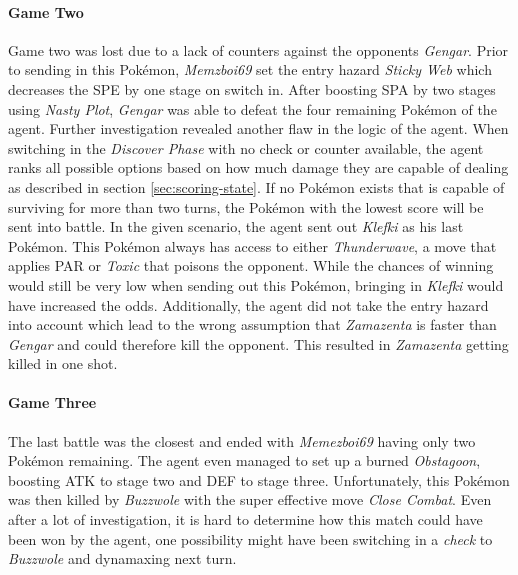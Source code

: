 \paragraph{Game Two}
Game two was lost due to a lack of counters against the opponents \textit{Gengar}. Prior to sending in this Pokémon,
\textit{Memzboi69} set the entry hazard \textit{Sticky Web} which decreases the \ac{SPE} by one stage on switch in.
After boosting \ac{SPA} by two stages using \textit{Nasty Plot}, \textit{Gengar} was able to defeat the four 
remaining Pokémon of the agent. Further investigation revealed another flaw in the logic of the agent. When switching
in the \textit{Discover Phase} with no check or counter available, the agent ranks all possible options based on how 
much damage they are capable of dealing as described in section \ref{sec:scoring-state}.
If no Pokémon exists that is capable of surviving for more than two turns, the Pokémon with the lowest score will
be sent into battle. In the given scenario, the agent sent out \textit{Klefki} as his last Pokémon. This Pokémon
always has access to either \textit{Thunderwave}, a move that applies \ac{PAR} or \textit{Toxic} that poisons the
opponent. While the chances of winning would still be very low when sending out this Pokémon, bringing in \textit{Klefki}
would have increased the odds. Additionally, the agent did not take the entry hazard into account which lead to
the wrong assumption that \textit{Zamazenta} is faster than \textit{Gengar} and could therefore kill the opponent.
This resulted in \textit{Zamazenta} getting killed in one shot.

\paragraph{Game Three}
The last battle was the closest and ended with \textit{Memezboi69} having only two Pokémon remaining. The agent
even managed to set up a burned \textit{Obstagoon}, boosting \ac{ATK} to stage two and \ac{DEF} to stage three.
Unfortunately, this Pokémon was then killed by \textit{Buzzwole} with the super effective move \textit{Close Combat}.
Even after a lot of investigation, it is hard to determine how this match could have been won by the agent, one 
possibility might have been switching in a \textit{check} to \textit{Buzzwole} and dynamaxing next turn. 